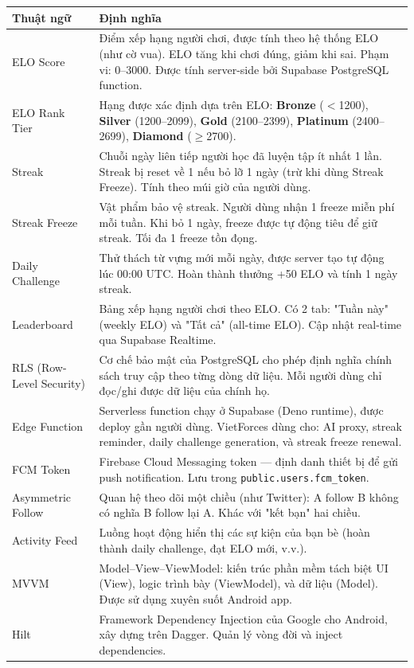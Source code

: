 \documentclass[12pt,a4paper]{article}
\begin{document}
\begin{longtable}{@{}p{3.5cm}p{10cm}@{}}
\toprule
\textbf{Thuật ngữ} & \textbf{Định nghĩa} \\
\midrule
\endhead
ELO Score & Điểm xếp hạng người chơi, được tính theo hệ thống ELO (như cờ vua). ELO tăng khi chơi đúng, giảm khi sai. Phạm vi: 0–3000. Được tính server-side bởi Supabase PostgreSQL function. \\
\midrule
ELO Rank Tier & Hạng được xác định dựa trên ELO: \textbf{Bronze} ($<$1200), \textbf{Silver} (1200--2099), \textbf{Gold} (2100--2399), \textbf{Platinum} (2400--2699), \textbf{Diamond} ($\geq$2700). \\
\midrule
Streak & Chuỗi ngày liên tiếp người học đã luyện tập ít nhất 1 lần. Streak bị reset về 1 nếu bỏ lỡ 1 ngày (trừ khi dùng Streak Freeze). Tính theo múi giờ của người dùng. \\
\midrule
Streak Freeze & Vật phẩm bảo vệ streak. Người dùng nhận 1 freeze miễn phí mỗi tuần. Khi bỏ 1 ngày, freeze được tự động tiêu để giữ streak. Tối đa 1 freeze tồn đọng. \\
\midrule
Daily Challenge & Thử thách từ vựng mới mỗi ngày, được server tạo tự động lúc 00:00 UTC. Hoàn thành thưởng +50 ELO và tính 1 ngày streak. \\
\midrule
Leaderboard & Bảng xếp hạng người chơi theo ELO. Có 2 tab: "Tuần này" (weekly ELO) và "Tất cả" (all-time ELO). Cập nhật real-time qua Supabase Realtime. \\
\midrule
RLS (Row-Level Security) & Cơ chế bảo mật của PostgreSQL cho phép định nghĩa chính sách truy cập theo từng dòng dữ liệu. Mỗi người dùng chỉ đọc/ghi được dữ liệu của chính họ. \\
\midrule
Edge Function & Serverless function chạy ở Supabase (Deno runtime), được deploy gần người dùng. VietForces dùng cho: AI proxy, streak reminder, daily challenge generation, và streak freeze renewal. \\
\midrule
FCM Token & Firebase Cloud Messaging token — định danh thiết bị để gửi push notification. Lưu trong \texttt{public.users.fcm\_token}. \\
\midrule
Asymmetric Follow & Quan hệ theo dõi một chiều (như Twitter): A follow B không có nghĩa B follow lại A. Khác với "kết bạn" hai chiều. \\
\midrule
Activity Feed & Luồng hoạt động hiển thị các sự kiện của bạn bè (hoàn thành daily challenge, đạt ELO mới, v.v.). \\
\midrule
MVVM & Model–View–ViewModel: kiến trúc phần mềm tách biệt UI (View), logic trình bày (ViewModel), và dữ liệu (Model). Được sử dụng xuyên suốt Android app. \\
\midrule
Hilt & Framework Dependency Injection của Google cho Android, xây dựng trên Dagger. Quản lý vòng đời và inject dependencies. \\
\bottomrule
\end{longtable}
\end{document}
